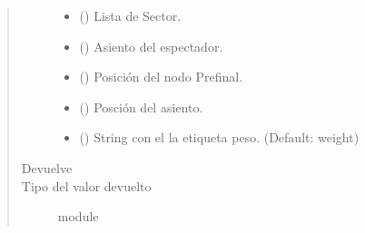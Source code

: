 \documentclass[letterpaper,10pt,spanish]{sphinxmanual}
\begin{document}
\begin{fulllineitems}
\begin{quote}
\begin{description}
\begin{itemize}
\item {} 
\sphinxAtStartPar
{} () \textendash{} Lista de Sector.

\item {} 
\sphinxAtStartPar
{} ({\hyperref[\detokenize{Clases:Clases.Asiento}]{}}) \textendash{} Asiento del espectador.

\item {} 
\sphinxAtStartPar
{} () \textendash{} Posición del nodo Prefinal.

\item {} 
\sphinxAtStartPar
{} () \textendash{} Posción del asiento.

\item {} 
\sphinxAtStartPar
{} (\sphinxstyleliteralemphasis{\sphinxupquote{, }}) \textendash{} String con el la etiqueta peso. (Default: weight)

\end{itemize}

\item[{Devuelve}] \leavevmode
\sphinxAtStartPar
{}

\item[{Tipo del valor devuelto}] \leavevmode
\sphinxAtStartPar
module

\end{description}\end{quote}

\end{fulllineitems}

\end{document}

